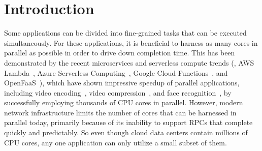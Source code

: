 \section{Introduction}

Some applications can be divided into fine-grained tasks that can be executed simultaneously.
For these applications, it is beneficial to harness as many cores in parallel as possible in order to drive down completion time.
This has been demonstrated by the recent microservices and serverless compute trends (\eg, AWS Lambda~\cite{aws-lambda}, Azure Serverless Computing~\cite{azure-functions}, Google Cloud Functions~\cite{gcloud-functions}, and OpenFaaS~\cite{openfaas}), which have shown impressive speedup of parallel applications, including video encoding~\cite{ExCamera}, video compression~\cite{sprocket}, and face recognition~\cite{cirrus}, by successfully employing thousands of CPU cores in parallel.
However, modern network infrastructure limits the number of cores that can be harnessed in parallel today, primarily because of its inability to support RPCs that complete quickly and predictably.
So even though cloud data centers contain millions of CPU cores, any one application can only utilize a small subset of them.


